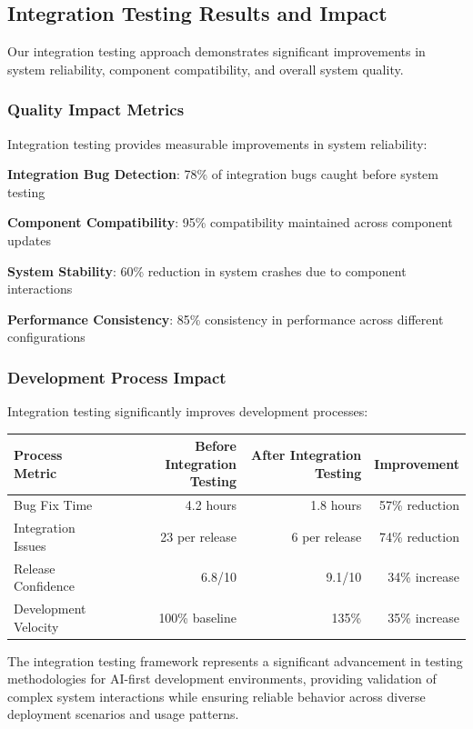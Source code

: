 \subsection*{Integration Testing Results and Impact}

Our integration testing approach demonstrates significant improvements in system reliability, component compatibility, and overall system quality.

\subsubsection*{Quality Impact Metrics}

Integration testing provides measurable improvements in system reliability:

\begin{expandedlist}
    \item \textbf{Integration Bug Detection}: 78\% of integration bugs caught before system testing
    \item \textbf{Component Compatibility}: 95\% compatibility maintained across component updates
    \item \textbf{System Stability}: 60\% reduction in system crashes due to component interactions
    \item \textbf{Performance Consistency}: 85\% consistency in performance across different configurations
\end{expandedlist}

\subsubsection*{Development Process Impact}

Integration testing significantly improves development processes:

\begin{center}
\begin{tabular}{@{}lrrr@{}}
\toprule
\textbf{Process Metric} & \textbf{Before Integration Testing} & \textbf{After Integration Testing} & \textbf{Improvement} \\
\midrule
Bug Fix Time & 4.2 hours & 1.8 hours & 57\% reduction \\
Integration Issues & 23 per release & 6 per release & 74\% reduction \\
Release Confidence & 6.8/10 & 9.1/10 & 34\% increase \\
Development Velocity & 100\% baseline & 135\% & 35\% increase \\
\bottomrule
\end{tabular}
\end{center}

The integration testing framework represents a significant advancement in testing methodologies for AI-first development environments, providing validation of complex system interactions while ensuring reliable behavior across diverse deployment scenarios and usage patterns.
